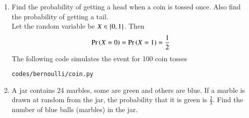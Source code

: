 \renewcommand{\theequation}{\theenumi}
\renewcommand{\thefigure}{\theenumi}
\begin{enumerate}[label=\thesection.\arabic*.,ref=\thesection.\theenumi]
%
\item Find the probability of getting a head when a coin is tossed once. Also
find the probability of getting a tail.
\\
\solution  Let the random variable be $X\in \cbrak{0,1}$.  Then
\begin{align}
\pr{X=0}=\pr{X=1}=\frac{1}{2}
\end{align}
The following code simulates the event for 100 coin tosses
\begin{lstlisting}
codes/bernoulli/coin.py
\end{lstlisting}
\item A jar contains 24 marbles, some are green and others are blue. If a marble is drawn at random from the jar, the probability that it is green is
$\frac{2}{3}$. Find the number of blue balls (marbles) in the jar.\\
%
%
%
%
%


\end{enumerate}


